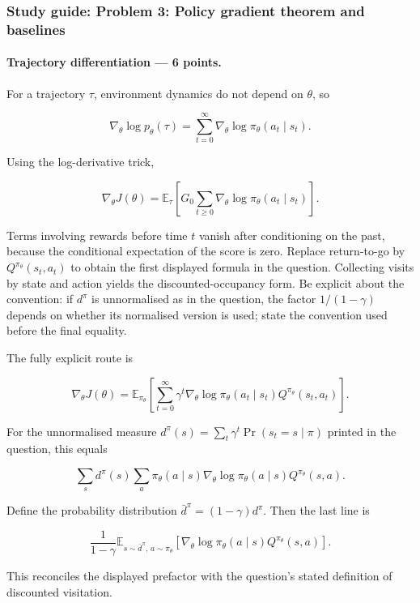 \documentclass[11pt,a4paper]{article}
\begin{document}
\subsubsection{Study guide: Problem 3: Policy gradient theorem and baselines}

\paragraph{Trajectory differentiation --- 6 points.}

For a trajectory $\tau$, environment dynamics do not depend on $\theta$, so

\[
\nabla_\theta\log p_\theta(\tau)
=\sum_{t=0}^{\infty}\nabla_\theta\log\pi_\theta(a_t\mid s_t).
\]

Using the log-derivative trick,

\[
\nabla_\theta J(\theta)
=\mathbb{E}_{\tau}\left[
G_0\sum_{t\geq0}\nabla_\theta\log\pi_\theta(a_t\mid s_t)
\right].
\]

Terms involving rewards before time $t$ vanish after conditioning on the past, because the conditional expectation of the score is zero. Replace return-to-go by $Q^{\pi_\theta}(s_t,a_t)$ to obtain the first displayed formula in the question. Collecting visits by state and action yields the discounted-occupancy form. Be explicit about the convention: if $d^\pi$ is unnormalised as in the question, the factor $1/(1-\gamma)$ depends on whether its normalised version is used; state the convention used before the final equality.

The fully explicit route is

\[
\nabla_\theta J(\theta)
=\mathbb{E}_{\pi_\theta}
\left[
\sum_{t=0}^{\infty}\gamma^t
\nabla_\theta\log\pi_\theta(a_t\mid s_t)
Q^{\pi_\theta}(s_t,a_t)
\right].
\]

For the unnormalised measure $d^\pi(s)=\sum_t\gamma^t\Pr(s_t=s\mid\pi)$ printed in the question, this equals

\[
\sum_s d^\pi(s)\sum_a\pi_\theta(a\mid s)
\nabla_\theta\log\pi_\theta(a\mid s)Q^{\pi_\theta}(s,a).
\]

Define the probability distribution $\bar d^\pi=(1-\gamma)d^\pi$. Then the last line is

\[
\frac{1}{1-\gamma}
\mathbb{E}_{s\sim\bar d^\pi,\,a\sim\pi_\theta}
\left[
\nabla_\theta\log\pi_\theta(a\mid s)Q^{\pi_\theta}(s,a)
\right].
\]

This reconciles the displayed prefactor with the question's stated definition of discounted visitation.
\end{document}
